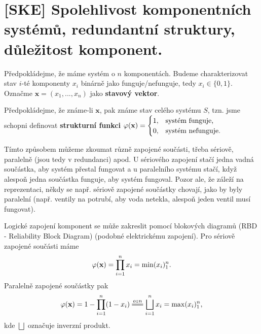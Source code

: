 \chapter{[SKE] Spolehlivost komponentních systémů, redundantní struktury, důležitost komponent.}

    \begin{define}
        Předpokládejme, že máme systém o $n$ komponentách. Budeme charakterizovat stav $i$-té komponenty $x_i$ binárně jako funguje/nefunguje, tedy $x_i\in\{0,1\}$. Označme $\textbf{x}=(x_1,...,x_n)$ jako \textbf{stavový vektor}. 
        
        Předpokládejme, že známe-li $\textbf{x}$, pak známe stav celého systému $S$, tzn. jsme schopni definovat \textbf{strukturní funkci} $\crossedphi(\textbf{x})=\begin{cases}
        1,&\text{systém funguje,}\\0,&\text{systém nefunguje.}
        \end{cases}$
    \end{define}

    Tímto způsobem můžeme zkoumat různě zapojené součásti, třeba sériově, 
    paralelně (jsou tedy v redundanci) apod. U sériového zapojení stačí 
    jedna vadná součástka, aby systém přestal fungovat a u paralelního 
    systému stačí, když alespoň jedna součástka funguje, aby systém 
    fungoval. Pozor ale, že záleží na reprezentaci, někdy se např. sériově 
    zapojené součástky chovají, jako by byly paralelní (např. ventily na 
    potrubí, aby voda netekla, alespoň jeden ventil musí fungovat).

    \begin{corollary}
        Logické zapojení komponent se může zakreslit pomocí blokových diagramů (RBD - Reliability Block Diagram) (podobné elektrickému zapojení). Pro sériově zapojené součásti máme 
        $$ \crossedphi(\textbf{x})=\prod_{i=1}^{n}x_i=\min(x_i)_1^n.$$
        Paralelně zapojené součástky pak
        $$ \crossedphi(\textbf{x})=1-\prod_{i=1}^{n}(1-x_i)\equal{ozn}\bigsqcup_{i=1}^n x_i=\max(x_i)_1^n, $$ kde $\bigsqcup$ označuje inverzní produkt.
    \end{corollary}

